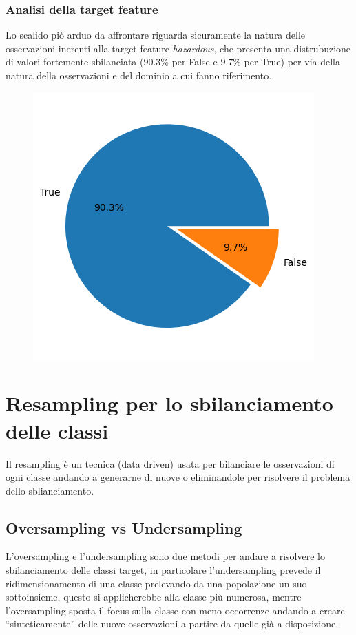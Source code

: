 \documentclass[italian,12pt,a4paper]{article}
\begin{document}
	
	\subsubsection{Analisi della target feature}
	Lo scalido piò arduo da affrontare riguarda sicuramente la natura delle osservazioni inerenti alla target feature \textit{hazardous}, che presenta una distrubuzione di valori fortemente sbilanciata ($90.3\%$ per False e $9.7\%$ per True) per via della natura della osservazioni e del dominio a cui fanno riferimento.
	
	\begin{center}
		\begin{figure}[!ht]
			\centering
			\includegraphics[scale=0.73]{imbcalss}
		\end{figure}
	\end{center}

	\section{Resampling per lo sbilanciamento delle classi}
	Il resampling è un tecnica (data driven) usata per bilanciare le osservazioni di ogni classe andando a generarne di nuove o eliminandole per risolvere il problema dello sblianciamento.
	
	\subsection{Oversampling vs Undersampling}

	L’oversampling e l’undersampling sono due metodi per andare a risolvere lo sbilanciamento delle classi target, in particolare l’undersampling prevede il ridimensionamento di una classe prelevando da una popolazione un suo sottoinsieme, questo si applicherebbe alla classe più numerosa, mentre l’oversampling sposta il focus sulla classe con meno occorrenze andando a creare “sinteticamente” delle nuove osservazioni a partire da quelle già a disposizione.
	
\end{document}
